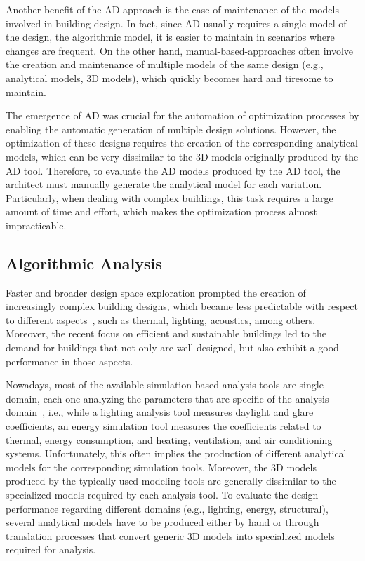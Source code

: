 Another benefit of the \ac{AD} approach is the ease of maintenance of the models involved in building design. In fact, since \ac{AD} usually requires a single model of the design, the algorithmic model, it is easier to maintain in scenarios where changes are frequent. On the other hand, manual-based-approaches often involve the creation and maintenance of multiple models of the same design (e.g., analytical models, 3D models), which quickly becomes hard and tiresome to maintain.

The emergence of \ac{AD} was crucial for the automation of optimization processes by enabling the automatic generation of multiple design solutions. However, the optimization of these designs requires the creation of the corresponding analytical models, which can be very dissimilar to the 3D models originally produced by the \ac{AD} tool. Therefore, to evaluate the \ac{AD} models produced by the \ac{AD} tool, the architect must manually generate the analytical model for each variation. Particularly, when dealing with complex buildings, this task requires a large amount of time and effort, which makes the optimization process almost impracticable.

\subsection{Algorithmic Analysis}

Faster and broader design space exploration prompted the creation of increasingly complex building designs, which became less predictable with respect to different aspects~\cite{Branco2017AD}, such as thermal, lighting, acoustics, among others. Moreover, the recent focus on efficient and sustainable buildings led to the demand for buildings that not only are well-designed, but also exhibit a good performance in those aspects.
	
Nowadays, most of the available simulation-based analysis tools are single-domain, each one analyzing the parameters that are specific of the analysis domain~\cite{Malkawi2005}, i.e., while a lighting analysis tool measures daylight and glare coefficients, an energy simulation tool measures the coefficients related to thermal, energy consumption, and heating, ventilation, and air conditioning systems. Unfortunately, this often implies the production of different analytical models for the corresponding simulation tools. Moreover, the 3D models produced by the typically used modeling tools are generally dissimilar to the specialized models required by each analysis tool. To evaluate the design performance regarding different domains (e.g., lighting, energy, structural), several analytical models have to be produced either by hand or through translation processes that convert generic 3D models into specialized models required for analysis.

